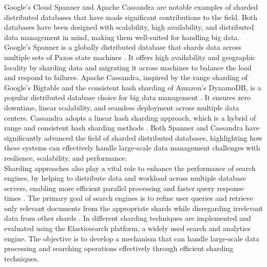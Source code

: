 \noindent Google's Cloud Spanner \cite{spanner} and Apache Cassandra \cite{cassandra2014apache} are notable examples of sharded distributed databases that have made significant contributions to the field. Both databases have been designed with scalability, high availability, and distributed data management in mind, making them well-suited for handling big data.
Google's Spanner is a globally distributed database that shards data across multiple sets of Paxos state machines \cite{corbett2013spanner}. It offers high availability and geographic locality by sharding data and migrating it across machines to balance the load and respond to failures. Apache Cassandra, inspired by the range sharding of Google's Bigtable and the consistent hash sharding of Amazon's DynamoDB, is a popular distributed database choice for big data management \cite{chebotko2015big}. It ensures zero downtime, linear scalability, and seamless deployment across multiple data centers. Cassandra adopts a linear hash sharding approach, which is a hybrid of range and consistent hash sharding methods  \cite{cassandra2014apache}. Both Spanner and Cassandra have significantly advanced the field of sharded distributed databases, highlighting how these systems can effectively handle large-scale data management challenges with resilience, scalability, and performance. \\

\noindent Sharding approaches also play a vital role to enhance the performance of search engines, by helping to distribute data and workload across multiple database servers, enabling more efficient parallel processing and faster query response times \cite{DHULAVVAGOL20201626}. The primary goal of search engines is to refine user queries and retrieve only relevant documents from the appropriate shards while disregarding irrelevant data from other shards \cite{mohammad2018dynamic}.
In \cite{elasticShard} different sharding techniques are implemented and evaluated using the Elasticsearch platform, a widely used search and analytics engine. The objective is to develop a mechanism that can handle large-scale data processing and searching operations effectively through efficient sharding techniques. \\

